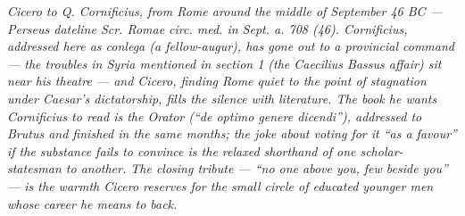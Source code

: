 
\textit{Cicero to Q. Cornificius, from Rome around the middle of September 46 BC ---
Perseus dateline \textit{Scr. Romae circ. med. in Sept. a. 708 (46)}.
Cornificius, addressed here as \textit{conlega} (a fellow-augur), has gone out
to a provincial command --- the troubles in Syria mentioned in section 1 (the
Caecilius Bassus affair) sit near his theatre --- and Cicero, finding Rome
quiet to the point of stagnation under Caesar's dictatorship, fills the
silence with literature. The book he wants Cornificius to read is the
\textit{Orator} (``de optimo genere dicendi''), addressed to Brutus and
finished in the same months; the joke about voting for it ``as a favour''
if the substance fails to convince is the relaxed shorthand of one
scholar-statesman to another. The closing tribute --- ``no one above you,
few beside you'' --- is the warmth Cicero reserves for the small circle of
educated younger men whose career he means to back.}
